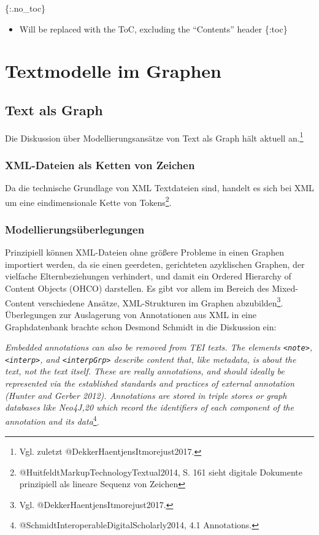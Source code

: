 \documentclass[ngerman,]{scrreprt}
\providecommand{\tightlist}{%
  \setlength{\itemsep}{0pt}\setlength{\parskip}{0pt}}
\begin{document}
\{:.no\_toc\}

\begin{itemize}
\tightlist
\item
  Will be replaced with the ToC, excluding the ``Contents'' header \{:toc\}
\end{itemize}

\chapter{Textmodelle im Graphen}\label{textmodelle-im-graphen}

\section{Text als Graph}\label{text-als-graph}

Die Diskussion über Modellierungsansätze von Text als Graph hält aktuell an.\footnote{Vgl. zuletzt @DekkerHaentjensItmorejust2017.}

\subsection{XML-Dateien als Ketten von Zeichen}\label{xml-dateien-als-ketten-von-zeichen}

Da die technische Grundlage von XML Textdateien sind, handelt es sich bei XML um eine eindimensionale Kette von Tokens\footnote{@HuitfeldtMarkupTechnologyTextual2014, S. 161 sieht digitale Dokumente prinzipiell als lineare Sequenz von Zeichen}.

\subsection{Modellierungsüberlegungen}\label{modellierungsuxfcberlegungen}

Prinzipiell können XML-Dateien ohne größere Probleme in einen Graphen importiert werden, da sie einen geerdeten, gerichteten azyklischen Graphen, der vielfache Elternbeziehungen verhindert, und damit ein Ordered Hierarchy of Content Objects (OHCO) darstellen. Es gibt vor allem im Bereich des Mixed-Content verschiedene Ansätze, XML-Strukturen im Graphen abzubilden\footnote{Vgl. @DekkerHaentjensItmorejust2017.}. Überlegungen zur Auslagerung von Annotationen aus XML in eine Graphdatenbank brachte schon Desmond Schmidt in die Diskussion ein:

\emph{Embedded annotations can also be removed from TEI texts. The elements \texttt{\textless{}note\textgreater{}}, \texttt{\textless{}interp\textgreater{}}, and \texttt{\textless{}interpGrp\textgreater{}} describe content that, like metadata, is about the text, not the text itself. These are really annotations, and should ideally be represented via the established standards and practices of external annotation (Hunter and Gerber 2012). Annotations are stored in triple stores or graph databases like Neo4J,20 which record the identifiers of each component of the annotation and its data}\footnote{@SchmidtInteroperableDigitalScholarly2014, 4.1 Annotations.}.
\end{document}
